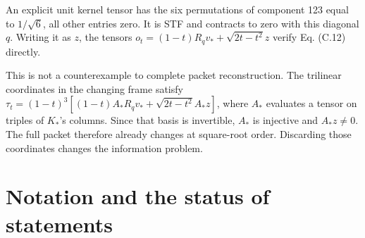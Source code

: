 \documentclass[
  11pt,
  a4paper]{article}
\begin{document}
An explicit unit kernel tensor has the six permutations of component 123 equal to \(1/\sqrt6\), all other entries zero. It is STF and contracts to zero with this diagonal \(q\). Writing it as \(z\), the tensors
\(o_t=(1-t)R_qv_*+\sqrt{2t-t^2}z\) verify Eq. (C.12) directly.

This is not a counterexample to complete packet reconstruction. The trilinear coordinates in the changing frame satisfy
\(\tau_t=(1-t)^3[(1-t)A_*R_qv_*+\sqrt{2t-t^2}A_*z]\),
where \(A_*\) evaluates a tensor on triples of \(K_*\)'s columns. Since that basis is invertible, \(A_*\) is injective and \(A_*z\ne0\). The full packet therefore already changes at square-root order. Discarding those coordinates changes the information problem.

\hypertarget{appendix-d.-notation-and-the-status-of-statements}{%
\section{Notation and the status of statements}\label{appendix-d.-notation-and-the-status-of-statements}}
\end{document}
